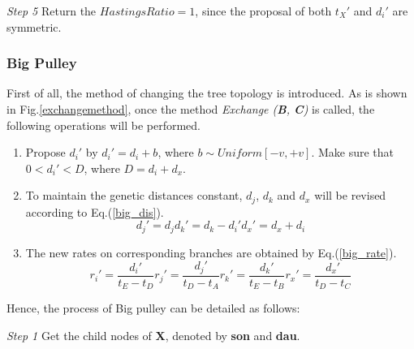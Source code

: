 \documentclass{bmcart}
\begin{document}
\emph{Step 5} Return the $HastingsRatio = 1$, since the proposal of  both ${t_X}'$ and ${d_i}'$ are symmetric.
\subsubsection*{Big Pulley}
First of all, the method of changing the tree topology  is introduced. As is shown in Fig.\ref{exchangemethod}, once the method \textit{Exchange (\textbf{B},\textbf{ C})} is called, the following operations will be performed.
\begin{enumerate} [(1)]
\item Propose ${d_i}'$ by ${d_i}' = {d_i} + b$, where $b \sim Uniform[ - v, + v]$. Make sure that $0 < {d_i}' < D$, where $D = {d_i} + {d_x}$.
\item To maintain the genetic distances constant, $d_j$, $d_k$ and $d_x$ will be revised according to Eq.(\ref{big_dis}).
 \begin{subequations}\label{big_dis}
  \begin{equation}
{d_j}' = {d_j}
  \end{equation}
  \begin{equation}
{d_k}' = {d_k} - {d_i}'
  \end{equation}
    \begin{equation}
{d_x}' = {d_x} + {d_i}
  \end{equation}
\end{subequations}
\item The new rates on corresponding branches are obtained by Eq.(\ref{big_rate}).
\begin{subequations}\label{big_rate}
\begin{equation}
{r_i}' = \frac{{{d_i}'}}{{{t_E} - {t_D}}}
\end{equation}
\begin{equation}
{r_j}' = \frac{{{d_j}'}}{{{t_D} - {t_A}}}
  \end{equation}
\begin{equation}
{r_k}' = \frac{{{d_k}'}}{{{t_E} - {t_B}}}
\end{equation}
\begin{equation}
{r_x}' = \frac{{{d_x}'}}{{{t_D} - {t_C}}}
\end{equation}
\end{subequations}
\end{enumerate}

Hence, the process of Big pulley can be detailed as follows:

\emph{Step 1} Get the child nodes of \textbf{X}, denoted by \textbf{son} and \textbf{dau}.
\end{document}
